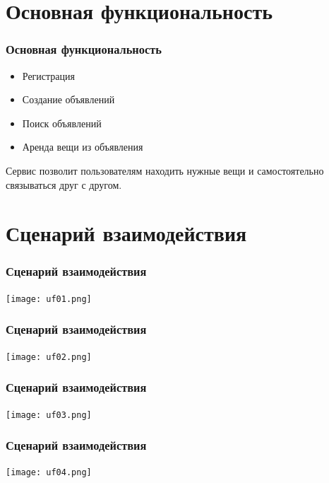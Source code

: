 \documentclass[12pt]{beamer}
\begin{document}
    \section{Основная функциональность}
    \begin{frame}
    \frametitle{Основная функциональность}

        \vspace{-1cm}

        \begin{itemize}
            \item Регистрация
            \item Создание объявлений
            \item Поиск объявлений
            \item Аренда вещи из объявления
            \newline
        \end{itemize}

        Сервис позволит пользователям находить нужные вещи и
        самостоятельно связываться друг с другом.
    \end{frame}

    \section{Сценарий взаимодействия}
    \begin{frame}
    \frametitle{Сценарий взаимодействия}
        \begin{center}
            \texttt{[image: uf01.png]}
        \end{center}        
    \end{frame}

    \begin{frame}
    \frametitle{Сценарий взаимодействия}
        \begin{center}
            \texttt{[image: uf02.png]}
        \end{center}
    \end{frame}

    \begin{frame}
    \frametitle{Сценарий взаимодействия}
        \begin{center}
            \texttt{[image: uf03.png]}
        \end{center}
    \end{frame}

    \begin{frame}
    \frametitle{Сценарий взаимодействия}
        \begin{center}
            \texttt{[image: uf04.png]}
        \end{center}
    \end{frame}
\end{document}
